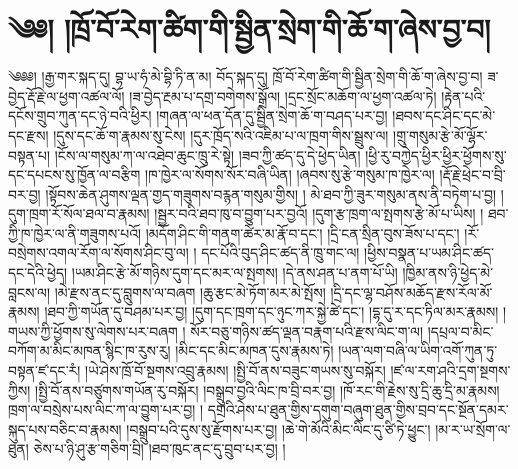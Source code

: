 \setcounter{footnote}{0} 
\chapter{༄༅། །ཁྲོ་བོ་རེག་ཚིག་གི་སྦྱིན་སྲེག་གི་ཆོ་ག་ཞེས་བྱ་བ།}༄༅༅། །རྒྱ་གར་སྐད་དུ། བྷ་ཡ་ཧཾ་མེ་བྷི་ཏི་ན་མ། བོད་སྐད་དུ། ཁྲོ་བོ་རེག་ཚིག་གི་སྦྱིན་སྲེག་གི་ཆོ་ག་ཞེས་བྱ་བ། ཟ་བྱེད་རྡོ་རྗེ་ལ་ཕྱག་འཚལ་ལོ། །ཟ་བྱེད་རྔམ་པ་དགྲ་བགེགས་སྒྲོལ། །དྲང་སྲོང་མཆོག་ལ་ཕྱག་འཚལ་ཏེ། །རྟེན་པའི་དངོས་གྲུབ་ཀུན་དང་ཉེ་བའི་ཕྱིར། །གཞན་ལ་ཕན་དོན་དུ་སྦྱིན་སྲེག་ཆོ་ག་བཤད་པར་བྱ། །ཐབས་དང་ཤིང་དང་མེ་དང་རྫས། །དུས་དང་ཆོ་ག་རྣམས་སུ་ངེས། །དུར་ཁྲོད་སའི་འཇིམ་པ་ལ་ཁྲག་གིས་སྦྲུས་ལ། །གྲུ་གསུམ་རྩེ་མོ་ལྷོར་བསྟན་པ། །ངོས་ལ་གསུམ་ཀ་ལ་འཐེབ་ཆུང་ཁྲུ་རེ་སྟེ། །ཟབ་ཀྱི་ཚད་དུ་དེ་ཕྱེད་ཡིན། །ཕྱི་རུ་བཀྱེད་ཕྱིར་ཕྱིར་ཕྱོགས་སུ་དང་དཔངས་སུ་ཁྱོན་ལ་བརྩིག །ཁ་ཁྱེར་ལ་སོགས་སོར་བཞི་ཡིན། །ཞབས་སུ་རྩེ་གསུམ་ཁ་ཁྱེར་ལ། །རྡོ་རྗེ་ཕྲེང་བ་བྲི་བར་བྱ། །སྟོབས་ཆེན་ཤུགས་ལྡན་གྱད་གཟུགས་བརྙན་གསུམ་གྱིས། ། མེ་ཐབ་ཀྱི་ཟུར་གསུམ་ནས་ནི་བཏེག་པ་བྱ། །དུག་ཁྲག་རོ་སོལ་ཐལ་བ་རྣམས། །སྦྱར་བའི་ཐབ་ཁུ་བ་བྱུག་པར་བྱའོ། །དུག་རྩ་ཁྲག་ལ་སྤགས་རྩེ་མོ་པ་ཡིས། ། ཐབ་ཀྱི་ཁ་ཁྱེར་ལ་ནི་གཟུགས་པའོ། །མདོག་ཤིང་གི་གནག་ཚེར་མ་རྣོ་བ་དང་། །དྲི་ངན་སྲིན་བུས་ཟོས་པ་དང་། །རོ་བསྲེགས་འགལ་རོག་ལ་སོགས་ཤིང་བུ་ལ། ། དང་པོའི་བུད་ཤིང་ཚད་ནི་ཁྲུ་གང་ལ། །ཕྱིས་བསྣན་པ་ཡམ་ཤིང་ཚད་དང་དེའི་ཕྱེད། །ཡམ་ཤིང་རྩེ་མོ་གཉིས་དུག་དང་མར་ལ་སྤགས། །དེ་ནས་ཤན་པ་ནག་པོ་ཡི། །ཁྱིམ་ནས་ཉི་ཕྱེད་མེ་བླངས་ལ། །མེ་རྫས་ནང་དུ་བླུགས་ལ་བཞག །ཆུ་རྩང་མེ་ཏོག་མར་མེ་སྤོས། །དྲི་དང་ལྷ་བཤོས་མཆོད་རྫས་རོལ་མོ་རྣམས། །ཐབ་ཀྱི་གཡོན་དུ་བཤམ་པར་བྱ། །དུག་དང་ཁྲག་དང་ཉུང་ཀར་སྐྱེ་ཚེ་དང་། །དྷ་དུ་ར་དང་ཏིལ་མར་རྣམས། །གཡས་ཀྱི་ཕྱོགས་སུ་ལེགས་པར་བཞག ། སོར་བཅུ་གཉིས་ཚད་ལྡན་བརྣག་པའི་རྫས་ལིང་ག་ལ། །དཔྲལ་བ་མིང་བཀོག་མ་མིང་མཁན་སྙིང་ཁ་རུས་རུ། །མིང་དང་མིང་མཁན་དུས་རྣམས་ཏེ། །ཡན་ལག་བཞི་ལ་ཡིག་འགོ་ཀུན་ཏུ་བསྟན་ཛ་དང་རཾ། །ཡེ་ཤེས་ཁྲོ་བོ་སྔགས་འབྲུ་རྣམས། །སྤྱི་བོ་ནས་བཟུང་གཡས་སུ་བསྐོར། །ཛ་ལ་རག་ཤའི་དྲག་སྔགས་ཀྱིས། །སྤྱི་བོ་ནས་བཙུགས་གཡོན་རུ་བསྐོར། །བསྒྲུབ་བྱའི་ལིང་ཁ་བྲི་བར་བྱ། །ཁོ་རང་གི་རྗེས་སུ་དྲི་ཆུ་དྲི་མ་རྣམས། ཁྲག་ལ་བསྲེས་པས་ལིང་ཀ་ལ་བྱུག་པར་བྱ། ། དགྲའི་ཤེས་པ་ཐུན་གྱིས་དགུག་བཞུག་ཐུན་གྱིས་བྲབ་དང་སྔོན་དམར་སྐུད་པས་བཅིང་བ་རྣམས། །བསྒྲུབ་པའི་དུས་སུ་རྫོགས་པར་བྱ། །ཆེ་གེ་མོའི་མིང་ལིང་དུ་ཙི་ཏེ་ཕྱུང་། །མ་ར་ཡ་སྲོག་ལ་ཐུན། ཅེས་པ་ཉི་ཤུ་རྩ་གཅིག་བྲི། །ཐབ་ཁུང་ནང་དུ་བྲུབ་པར་བྱ། །
